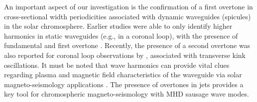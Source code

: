 An important aspect of our investigation is the confirmation of a first overtone in cross-sectional width periodicities associated with dynamic waveguides (spicules) in the solar chromosphere.  Earlier studies were able to only identify higher harmonics in static waveguides (e.g., in a coronal loop), with the presence of fundamental and first overtone \citep{verwichte2004, guo2015}. Recently, the presence of a second overtone was also reported for coronal loop observations by \citet{duckenfield2019}, associated with transverse kink oscillations. It must be noted that wave harmonics can provide vital clues regarding plasma and magnetic field characteristics of the waveguide via solar magneto-seismology applications \citep{andries2005,andries2009}. The presence of overtones in jets provides a key tool for chromospheric magneto-seismology with MHD sausage wave modes. 
